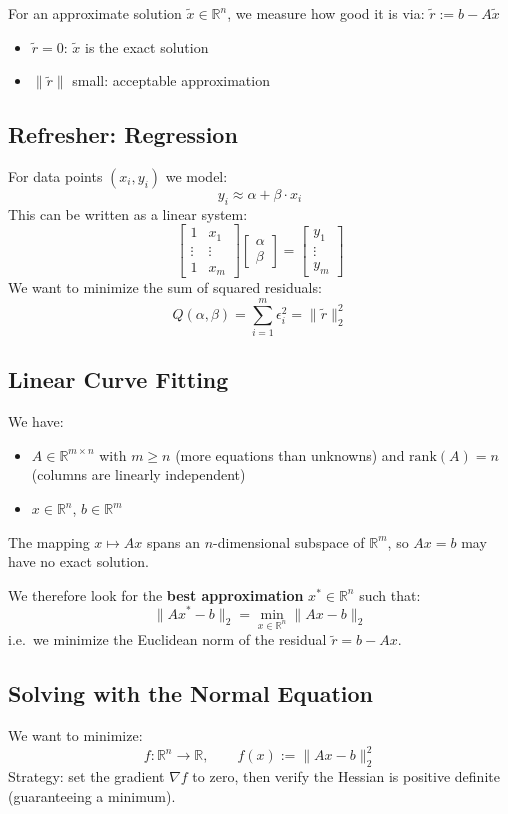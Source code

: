 \documentclass{article}
\begin{document}
For an approximate solution $\tilde{x} \in \mathbb{R}^n$, we measure how good it is via:
$\tilde{r} := b - A\tilde{x}$
\begin{itemize}
  \item $\tilde{r} = 0$: $\tilde{x}$ is the exact solution
  \item $\|\tilde{r}\|$ small: acceptable approximation
\end{itemize}

\subsection{Refresher: Regression}
For data points $(x_i, y_i)$ we model:
\[y_i \approx \alpha + \beta \cdot x_i\]
This can be written as a linear system:
\[
\begin{bmatrix} 1 & x_1 \\ \vdots & \vdots \\ 1 & x_m \end{bmatrix}
\begin{bmatrix} \alpha \\ \beta \end{bmatrix}
=
\begin{bmatrix} y_1 \\ \vdots \\ y_m \end{bmatrix}
\]
We want to minimize the sum of squared residuals:
\[Q(\alpha,\beta) = \sum_{i=1}^{m}\epsilon_i^2 = \|\tilde{r}\|_2^2\]

\subsection{Linear Curve Fitting}
We have:
\begin{itemize}
  \item $A \in \mathbb{R}^{m \times n}$ with $m \geq n$ (more equations than unknowns)
        and $\mathrm{rank}(A) = n$ (columns are linearly independent)
  \item $x \in \mathbb{R}^n$, $b \in \mathbb{R}^m$
\end{itemize}
The mapping $x \mapsto Ax$ spans an $n$-dimensional subspace of $\mathbb{R}^m$, so
$Ax = b$ may have no exact solution.

We therefore look for the \textbf{best approximation} $x^* \in \mathbb{R}^n$ such that:
\[
  \|Ax^* - b\|_2 = \min_{x \in \mathbb{R}^n} \|Ax - b\|_2
\]
i.e.\ we minimize the Euclidean norm of the residual $\tilde{r} = b - Ax$.

\subsection{Solving with the Normal Equation}
We want to minimize:
\[f : \mathbb{R}^n \to \mathbb{R}, \qquad f(x) := \|Ax - b\|_2^2\]
Strategy: set the gradient $\nabla f$ to zero, then verify the Hessian is
positive definite (guaranteeing a minimum).
\end{document}
